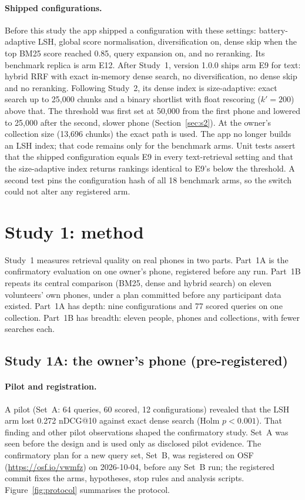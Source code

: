 \documentclass[11pt,a4paper]{article}
\makeatletter
\newcommand{\ndcg}{nDCG@10}
\makeatother
\begin{document}
\paragraph{Shipped configurations.} Before this study the app shipped a configuration with these settings: battery-adaptive LSH, global score normalisation, diversification on, dense skip when the top BM25 score reached 0.85, query expansion on, and no reranking. Its benchmark replica is arm E12. After Study~1, version 1.0.0 ships arm E9 for text: hybrid RRF with exact in-memory dense search, no diversification, no dense skip and no reranking. Following Study~2, its dense index is size-adaptive: exact search up to 25,000 chunks and a binary shortlist with float rescoring ($k'=200$) above that. The threshold was first set at 50,000 from the first phone and lowered to 25,000 after the second, slower phone (Section~\ref{sec:s2}). At the owner's collection size (13,696 chunks) the exact path is used. The app no longer builds an LSH index; that code remains only for the benchmark arms. Unit tests assert that the shipped configuration equals E9 in every text-retrieval setting and that the size-adaptive index returns rankings identical to E9's below the threshold. A second test pins the configuration hash of all 18 benchmark arms, so the switch could not alter any registered arm.

\section{Study 1: method}\label{sec:s1method}

Study~1 measures retrieval quality on real phones in two parts. Part~1A is the confirmatory evaluation on one owner's phone, registered before any run. Part~1B repeats its central comparison (BM25, dense and hybrid search) on eleven volunteers' own phones, under a plan committed before any participant data existed. Part~1A has depth: nine configurations and 77 scored queries on one collection. Part~1B has breadth: eleven people, phones and collections, with fewer searches each.

\subsection{Study 1A: the owner's phone (pre-registered)}\label{sec:s1a}

\paragraph{Pilot and registration.} A pilot (Set~A: 64 queries, 60 scored, 12 configurations) revealed that the LSH arm lost 0.272 \ndcg{} against exact dense search (Holm $p<0.001$). That finding and other pilot observations shaped the confirmatory study. Set~A was seen before the design and is used only as disclosed pilot evidence. The confirmatory plan for a new query set, Set~B, was registered on OSF (\url{https://osf.io/vwmfz}) on 2026-10-04, before any Set~B run; the registered commit fixes the arms, hypotheses, stop rules and analysis scripts. Figure~\ref{fig:protocol} summarises the protocol.
\end{document}
